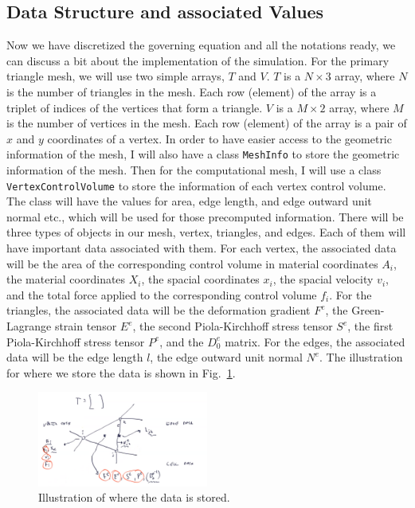 \documentclass[acmtog]{acmart}
\begin{document}
\subsection{Data Structure and associated Values} 
Now we have discretized the governing equation and all the notations ready, we can discuss a bit about the implementation of the simulation. For the primary triangle mesh, we will use two simple arrays, $T$ and $V$. $T$ is a $N \times 3$ array, where $N$ is the number of triangles in the mesh. Each row (element) of the array is a triplet of indices of the vertices that form a triangle. $V$ is a $M \times 2$ array, where $M$ is the number of vertices in the mesh. Each row (element) of the array is a pair of $x$ and $y$ coordinates of a vertex. In order to have easier access to the geometric information of the mesh, I will also have a class \texttt{MeshInfo} to store the geometric information of the mesh. Then for the computational mesh, I will use a class \texttt{VertexControlVolume} to store the information of each vertex control volume. The class will have the values for area, edge length, and edge outward unit normal etc., which will be used for those precomputed information. There will be three types of objects in our mesh, vertex, triangles, and edges. Each of them will have important data associated with them. For each vertex, the associated data will be the area of the corresponding control volume in material coordinates $A_i$, the material coordinates $X_i$, the spacial coordinates $x_i$, the spacial velocity $v_i$, and the total force applied to the corresponding control volume $f_i$. For the triangles, the associated data will be the deformation gradient $F^e$, the Green-Lagrange strain tensor $E^e$, the second Piola-Kirchhoff stress tensor $S^e$, the first Piola-Kirchhoff stress tensor $P^e$, and the $D^e_0$ matrix. For the edges, the associated data will be the edge length $l$, the edge outward unit normal $N^e$. The illustration for where we store the data is shown in Fig.~\ref{fig:data}.

\begin{figure}[h]
  \centering
  \includegraphics[width=0.5\textwidth]{images/data.png}
  \caption{Illustration of where the data is stored.}
  \label{fig:data}
\end{figure}
\end{document}
